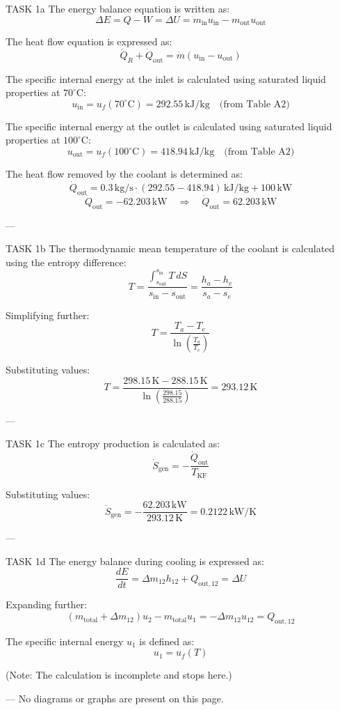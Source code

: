TASK 1a  
The energy balance equation is written as:  
\[
\Delta E = Q - W = \Delta U = m_{\text{in}} u_{\text{in}} - m_{\text{out}} u_{\text{out}}
\]  

The heat flow equation is expressed as:  
\[
\dot{Q}_R + \dot{Q}_{\text{out}} = \dot{m} (u_{\text{in}} - u_{\text{out}})
\]  

The specific internal energy at the inlet is calculated using saturated liquid properties at \( 70^\circ\text{C} \):  
\[
u_{\text{in}} = u_f(70^\circ\text{C}) = 292.55 \, \text{kJ/kg} \quad \text{(from Table A2)}
\]  

The specific internal energy at the outlet is calculated using saturated liquid properties at \( 100^\circ\text{C} \):  
\[
u_{\text{out}} = u_f(100^\circ\text{C}) = 418.94 \, \text{kJ/kg} \quad \text{(from Table A2)}
\]  

The heat flow removed by the coolant is determined as:  
\[
\dot{Q}_{\text{out}} = 0.3 \, \text{kg/s} \cdot (292.55 - 418.94) \, \text{kJ/kg} + 100 \, \text{kW}
\]  
\[
\dot{Q}_{\text{out}} = -62.203 \, \text{kW} \quad \Rightarrow \quad \dot{Q}_{\text{out}} = 62.203 \, \text{kW}
\]  

---

TASK 1b  
The thermodynamic mean temperature of the coolant is calculated using the entropy difference:  
\[
T = \frac{\int_{s_{\text{out}}}^{s_{\text{in}}} T \, dS}{s_{\text{in}} - s_{\text{out}}} = \frac{h_a - h_e}{s_a - s_e}
\]  

Simplifying further:  
\[
T = \frac{T_a - T_e}{\ln \left( \frac{T_a}{T_e} \right)}
\]  

Substituting values:  
\[
T = \frac{298.15 \, \text{K} - 288.15 \, \text{K}}{\ln \left( \frac{298.15}{288.15} \right)} = 293.12 \, \text{K}
\]  

---

TASK 1c  
The entropy production is calculated as:  
\[
\dot{S}_{\text{gen}} = -\frac{\dot{Q}_{\text{out}}}{T_{\text{KF}}}
\]  

Substituting values:  
\[
\dot{S}_{\text{gen}} = -\frac{62.203 \, \text{kW}}{293.12 \, \text{K}} = 0.2122 \, \text{kW/K}
\]  

---

TASK 1d  
The energy balance during cooling is expressed as:  
\[
\frac{dE}{dt} = \Delta m_{12} h_{12} + Q_{\text{out},12} = \Delta U
\]  

Expanding further:  
\[
(m_{\text{total}} + \Delta m_{12}) u_2 - m_{\text{total}} u_1 = -\Delta m_{12} u_{12} = Q_{\text{out},12}
\]  

The specific internal energy \( u_1 \) is defined as:  
\[
u_1 = u_f(T)
\]  

(Note: The calculation is incomplete and stops here.)  

---  
No diagrams or graphs are present on this page.